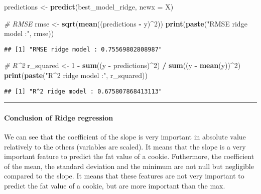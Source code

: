 \documentclass[
]{article}
\newenvironment{Shaded}{\begin{snugshade}}{\end{snugshade}}
\newcommand{\AttributeTok}[1]{\textcolor[rgb]{0.13,0.29,0.53}{#1}}
\newcommand{\CommentTok}[1]{\textcolor[rgb]{0.56,0.35,0.01}{\textit{#1}}}
\newcommand{\DecValTok}[1]{\textcolor[rgb]{0.00,0.00,0.81}{#1}}
\newcommand{\FunctionTok}[1]{\textcolor[rgb]{0.13,0.29,0.53}{\textbf{#1}}}
\newcommand{\NormalTok}[1]{#1}
\newcommand{\OtherTok}[1]{\textcolor[rgb]{0.56,0.35,0.01}{#1}}
\newcommand{\SpecialCharTok}[1]{\textcolor[rgb]{0.81,0.36,0.00}{\textbf{#1}}}
\newcommand{\StringTok}[1]{\textcolor[rgb]{0.31,0.60,0.02}{#1}}
\begin{document}
\begin{Shaded}
\begin{Highlighting}[]
\NormalTok{predictions }\OtherTok{\textless{}{-}} \FunctionTok{predict}\NormalTok{(best\_model\_ridge, }\AttributeTok{newx =}\NormalTok{ X)}

\CommentTok{\# RMSE}
\NormalTok{rmse }\OtherTok{\textless{}{-}} \FunctionTok{sqrt}\NormalTok{(}\FunctionTok{mean}\NormalTok{((predictions }\SpecialCharTok{{-}}\NormalTok{ y)}\SpecialCharTok{\^{}}\DecValTok{2}\NormalTok{)) }
\FunctionTok{print}\NormalTok{(}\FunctionTok{paste}\NormalTok{(}\StringTok{"RMSE ridge model :"}\NormalTok{, rmse))}
\end{Highlighting}
\end{Shaded}

\begin{verbatim}
## [1] "RMSE ridge model : 0.75569802808987"
\end{verbatim}

\begin{Shaded}
\begin{Highlighting}[]
\CommentTok{\# R\^{}2}
\NormalTok{r\_squared }\OtherTok{\textless{}{-}} \DecValTok{1} \SpecialCharTok{{-}} \FunctionTok{sum}\NormalTok{((y }\SpecialCharTok{{-}}\NormalTok{ predictions)}\SpecialCharTok{\^{}}\DecValTok{2}\NormalTok{) }\SpecialCharTok{/} \FunctionTok{sum}\NormalTok{((y }\SpecialCharTok{{-}} \FunctionTok{mean}\NormalTok{(y))}\SpecialCharTok{\^{}}\DecValTok{2}\NormalTok{)}
\FunctionTok{print}\NormalTok{(}\FunctionTok{paste}\NormalTok{(}\StringTok{"R\^{}2 ridge model :"}\NormalTok{, r\_squared))}
\end{Highlighting}
\end{Shaded}

\begin{verbatim}
## [1] "R^2 ridge model : 0.675807868413113"
\end{verbatim}

\begin{center}\rule{0.5\linewidth}{0.5pt}\end{center}

\paragraph{Conclusion of Ridge
regression}\label{conclusion-of-ridge-regression}

We can see that the coefficient of the slope is very important in
absolute value relatively to the others (variables are scaled). It means
that the slope is a very important feature to predict the fat value of a
cookie. Futhermore, the coefficient of the mean, the standard deviation
and the minimum are not null but negligible compared to the slope. It
means that these features are not very important to predict the fat
value of a cookie, but are more important than the max.
\end{document}
